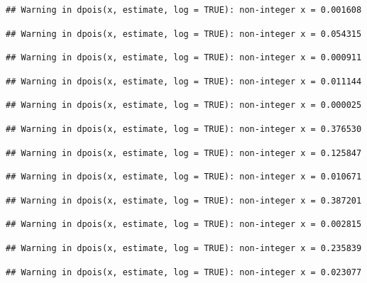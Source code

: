\documentclass[]{article}
\begin{document}
\begin{verbatim}
## Warning in dpois(x, estimate, log = TRUE): non-integer x = 0.001608
\end{verbatim}

\begin{verbatim}
## Warning in dpois(x, estimate, log = TRUE): non-integer x = 0.054315
\end{verbatim}

\begin{verbatim}
## Warning in dpois(x, estimate, log = TRUE): non-integer x = 0.000911
\end{verbatim}

\begin{verbatim}
## Warning in dpois(x, estimate, log = TRUE): non-integer x = 0.011144
\end{verbatim}

\begin{verbatim}
## Warning in dpois(x, estimate, log = TRUE): non-integer x = 0.000025
\end{verbatim}

\begin{verbatim}
## Warning in dpois(x, estimate, log = TRUE): non-integer x = 0.376530
\end{verbatim}

\begin{verbatim}
## Warning in dpois(x, estimate, log = TRUE): non-integer x = 0.125847
\end{verbatim}

\begin{verbatim}
## Warning in dpois(x, estimate, log = TRUE): non-integer x = 0.010671
\end{verbatim}

\begin{verbatim}
## Warning in dpois(x, estimate, log = TRUE): non-integer x = 0.387201
\end{verbatim}

\begin{verbatim}
## Warning in dpois(x, estimate, log = TRUE): non-integer x = 0.002815
\end{verbatim}

\begin{verbatim}
## Warning in dpois(x, estimate, log = TRUE): non-integer x = 0.235839
\end{verbatim}

\begin{verbatim}
## Warning in dpois(x, estimate, log = TRUE): non-integer x = 0.023077
\end{verbatim}
\end{document}
